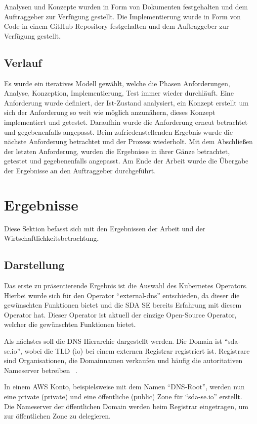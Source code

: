 Analysen und Konzepte wurden in Form von Dokumenten festgehalten und dem Auftraggeber zur Verfügung gestellt.
Die Implementierung wurde in Form von Code in einem GitHub Repository festgehalten und dem Auftraggeber zur Verfügung gestellt.

\subsection{Verlauf}
\label{subsec:description:verlauf}
Es wurde ein iteratives Modell gewählt, welche die Phasen Anforderungen, Analyse, Konzeption, Implementierung, Test immer wieder durchläuft.
Eine Anforderung wurde definiert, der Ist-Zustand analysiert, ein Konzept erstellt um sich der Anforderung so weit wie möglich anzunähern, dieses Konzept implementiert und getestet.
Daraufhin wurde die Anforderung erneut betrachtet und gegebenenfalls angepasst.
Beim zufriedenstellenden Ergebnis wurde die nächste Anforderung betrachtet und der Prozess wiederholt.
Mit dem Abschließen der letzten Anforderung, wurden die Ergebnisse in ihrer Gänze betrachtet, getestet und gegebenenfalls angepasst.
Am Ende der Arbeit wurde die Übergabe der Ergebnisse an den Auftraggeber durchgeführt.

\section{Ergebnisse}
\label{sec:description:ergebnisse}
Diese Sektion befasst sich mit den Ergebnissen der Arbeit und der Wirtschaftlichkeitsbetrachtung.

\subsection{Darstellung}
\label{subsec:description:darstellung}
Das erste zu präsentierende Ergebnis ist die Auswahl des Kubernetes Operators.
Hierbei wurde sich für den Operator \enquote{external-dns} entschieden, da dieser die gewünschten Funktionen bietet und die SDA SE bereits Erfahrung mit diesem Operator hat.
Dieser Operator ist aktuell der einzige Open-Source Operator, welcher die gewünschten Funktionen bietet.
\medskip

Als nächstes soll die DNS Hierarchie dargestellt werden.
Die Domain ist \enquote{sda-se.io}, wobei die \ac{TLD} (io) bei einem externen Registrar registriert ist.
Registrare sind Organisationen, die Domainnamen verkaufen und häufig die autoritativen Nameserver betreiben ~\cite{chung2017understanding}.

In einem AWS Konto, beispielsweise mit dem Namen \enquote{DNS-Root}, werden nun eine private (private) und eine öffentliche (public) Zone für \enquote{sda-se.io} erstellt.
Die Nameserver der öffentlichen Domain werden beim Registrar eingetragen, um zur öffentlichen Zone zu delegieren.
\medskip

